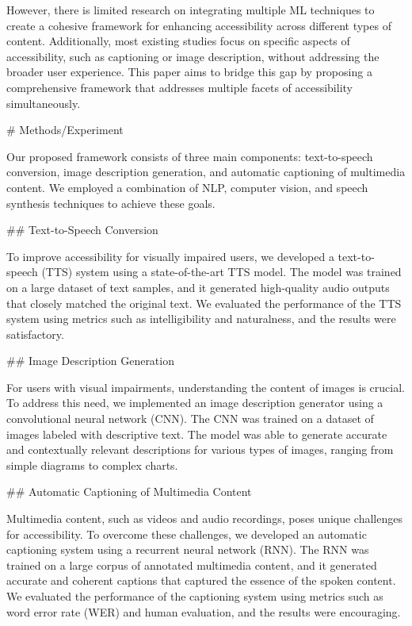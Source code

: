 However, there is limited research on integrating multiple ML techniques to create a cohesive framework for enhancing accessibility across different types of content. Additionally, most existing studies focus on specific aspects of accessibility, such as captioning or image description, without addressing the broader user experience. This paper aims to bridge this gap by proposing a comprehensive framework that addresses multiple facets of accessibility simultaneously.

# Methods/Experiment

Our proposed framework consists of three main components: text-to-speech conversion, image description generation, and automatic captioning of multimedia content. We employed a combination of NLP, computer vision, and speech synthesis techniques to achieve these goals.

## Text-to-Speech Conversion

To improve accessibility for visually impaired users, we developed a text-to-speech (TTS) system using a state-of-the-art TTS model. The model was trained on a large dataset of text samples, and it generated high-quality audio outputs that closely matched the original text. We evaluated the performance of the TTS system using metrics such as intelligibility and naturalness, and the results were satisfactory.

## Image Description Generation

For users with visual impairments, understanding the content of images is crucial. To address this need, we implemented an image description generator using a convolutional neural network (CNN). The CNN was trained on a dataset of images labeled with descriptive text. The model was able to generate accurate and contextually relevant descriptions for various types of images, ranging from simple diagrams to complex charts.

## Automatic Captioning of Multimedia Content

Multimedia content, such as videos and audio recordings, poses unique challenges for accessibility. To overcome these challenges, we developed an automatic captioning system using a recurrent neural network (RNN). The RNN was trained on a large corpus of annotated multimedia content, and it generated accurate and coherent captions that captured the essence of the spoken content. We evaluated the performance of the captioning system using metrics such as word error rate (WER) and human evaluation, and the results were encouraging.

